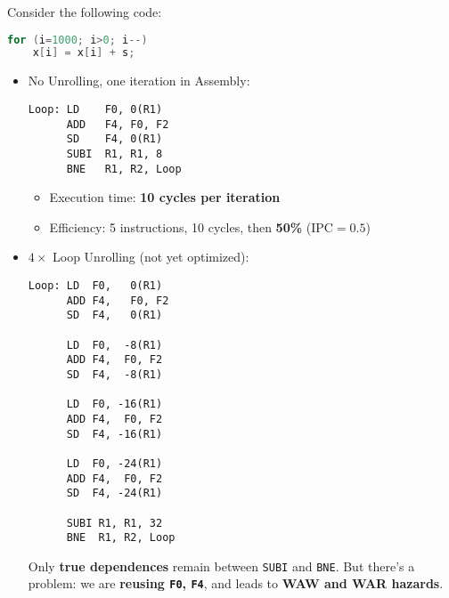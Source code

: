 \highspace
\begin{examplebox}
    Consider the following code:
    \begin{lstlisting}[language=C]
for (i=1000; i>0; i--)
    x[i] = x[i] + s;
    \end{lstlisting}
    \begin{itemize}
        \item No Unrolling, one iteration in Assembly:
        \begin{lstlisting}[language=riscv]
Loop: LD    F0, 0(R1)
      ADD   F4, F0, F2
      SD    F4, 0(R1)
      SUBI  R1, R1, 8
      BNE   R1, R2, Loop\end{lstlisting}
        \begin{itemize}
            \item Execution time: \textbf{10 cycles per iteration}
            \item Efficiency: 5 instructions, 10 cycles, then \textbf{50\%} ($\text{IPC} = 0.5$)
        \end{itemize}

        \newpage

        \item $4\times$ Loop Unrolling (not yet optimized):
        \begin{lstlisting}[language=riscv]
Loop: LD  F0,   0(R1)
      ADD F4,   F0, F2
      SD  F4,   0(R1)

      LD  F0,  -8(R1)
      ADD F4,  F0, F2
      SD  F4,  -8(R1)

      LD  F0, -16(R1)
      ADD F4,  F0, F2
      SD  F4, -16(R1)

      LD  F0, -24(R1)
      ADD F4,  F0, F2
      SD  F4, -24(R1)

      SUBI R1, R1, 32
      BNE  R1, R2, Loop\end{lstlisting}
        Only \textbf{true dependences} remain between \texttt{SUBI} and \texttt{BNE}. But there's a problem: we are \textbf{reusing \texttt{F0}, \texttt{F4}}, and leads to \textbf{WAW and WAR hazards}.
    \end{itemize}
\end{examplebox}

